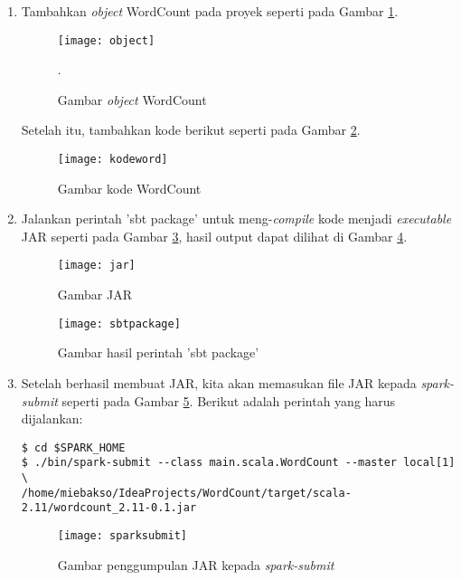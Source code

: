 \begin{enumerate}
\item Tambahkan \textit{object} WordCount pada proyek seperti pada Gambar \ref{fig:object}.

\begin{figure}[H]
    \centering  
    \texttt{[image: object]}  
    \caption[Gambar \textit{object} WordCount]{Gambar \textit{object} WordCount}.
    \label{fig:object} 
\end{figure}


Setelah itu, tambahkan kode berikut seperti pada Gambar \ref{fig:kodeword}.

\begin{figure}[H]
    \centering  
    \texttt{[image: kodeword]}  
    \caption[Gambar kode WordCount]{Gambar kode WordCount} 
    \label{fig:kodeword} 
\end{figure}

\item Jalankan perintah 'sbt package' untuk meng-\textit{compile} kode menjadi \textit{executable} JAR seperti pada Gambar \ref{fig:jar}, hasil output dapat dilihat di Gambar \ref{fig:sbtpackage}.

\begin{figure}[H]
    \centering  
    \texttt{[image: jar]}  
    \caption[Gambar JAR]{Gambar JAR} 
    \label{fig:jar} 
\end{figure}

\begin{figure}[H]
    \centering  
    \texttt{[image: sbtpackage]}  
    \caption[Gambar hasil perintah 'sbt package']{Gambar hasil perintah 'sbt package'} 
    \label{fig:sbtpackage} 
\end{figure}

\item Setelah berhasil membuat JAR, kita akan memasukan file JAR kepada \textit{spark-submit} seperti pada Gambar \ref{fig:sparksubmit}. Berikut adalah perintah yang harus dijalankan: 

\begin{verbatim}
$ cd $SPARK_HOME
$ ./bin/spark-submit --class main.scala.WordCount --master local[1] \
/home/miebakso/IdeaProjects/WordCount/target/scala-2.11/wordcount_2.11-0.1.jar 
\end{verbatim}

\begin{figure}[H]
    \centering  
    \texttt{[image: sparksubmit]}  
    \caption[Gambar penggumpulan JAR kepada \textit{spark-submit}]{Gambar penggumpulan JAR kepada \textit{spark-submit}} 
    \label{fig:sparksubmit} 
\end{figure}


\end{enumerate}
